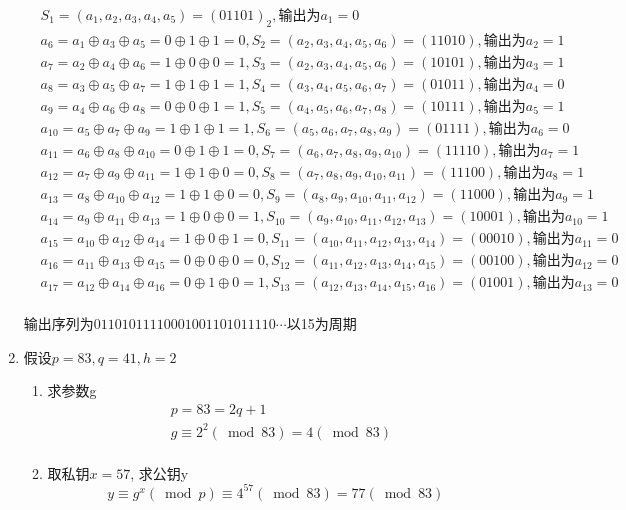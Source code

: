 \documentclass[UTF8]{ctexart}
\begin{document}
\begin{enumerate}
      $$
      \begin{aligned}
        &S_1=(a_1, a_2, a_3, a_4, a_5)=(01101)_2, \mbox{输出为}a_1=0\\
        &a_6=a_1\oplus a_3\oplus a_5=0\oplus 1\oplus 1=0, S_2=(a_2, a_3, a_4, a_5, a_6)=(11010), \mbox{输出为}a_2=1\\
        &a_7=a_2\oplus a_4\oplus a_6=1\oplus 0\oplus 0=1, S_3=(a_2, a_3, a_4, a_5, a_6)=(10101), \mbox{输出为}a_3=1\\
        &a_8=a_3\oplus a_5\oplus a_7=1\oplus 1\oplus 1=1, S_4=(a_3, a_4, a_5, a_6, a_7)=(01011), \mbox{输出为}a_4=0\\
        &a_9=a_4\oplus a_6\oplus a_8=0\oplus 0\oplus 1=1, S_5=(a_4, a_5, a_6, a_7, a_8)=(10111), \mbox{输出为}a_5=1\\
        &a_{10}=a_5\oplus a_7\oplus a_9=1\oplus 1\oplus 1=1, S_6=(a_5, a_6, a_7, a_8, a_9)=(01111), \mbox{输出为}a_6=0\\
        &a_{11}=a_6\oplus a_8\oplus a_{10}=0\oplus 1\oplus 1=0, S_7=(a_6, a_7, a_8, a_9, a_10)=(11110), \mbox{输出为}a_7=1\\
        &a_{12}=a_7\oplus a_9\oplus a_{11}=1\oplus 1\oplus 0=0, S_8=(a_7, a_8, a_9, a_10, a_11)=(11100), \mbox{输出为}a_8=1\\
        &a_{13}=a_8\oplus a_{10}\oplus a_{12}=1\oplus 1\oplus 0=0, S_9=(a_8, a_9, a_10, a_11, a_12)=(11000), \mbox{输出为}a_9=1\\
        &a_{14}=a_9\oplus a_{11}\oplus a_{13}=1\oplus 0\oplus 0=1, S_{10}=(a_9, a_{10}, a_{11}, a_{12}, a_{13})=(10001), \mbox{输出为}a_{10}=1\\
        &a_{15}=a_{10}\oplus a_{12}\oplus a_{14}=1\oplus 0\oplus 1=0, S_{11}=(a_{10}, a_{11}, a_{12}, a_{13}, a_{14})=(00010), \mbox{输出为}a_{11}=0\\
        &a_{16}=a_{11}\oplus a_{13}\oplus a_{15}=0\oplus 0\oplus 0=0, S_{12}=(a_{11}, a_{12}, a_{13}, a_{14}, a_{15})=(00100), \mbox{输出为}a_{12}=0\\
        &a_{17}=a_{12}\oplus a_{14}\oplus a_{16}=0\oplus 1\oplus 0=1, S_{13}=(a_{12}, a_{13}, a_{14}, a_{15}, a_{16})=(01001), \mbox{输出为}a_{13}=0\\
      \end{aligned}
      $$

      输出序列为$01101011110001001101011110\cdots$以15为周期

      \item 假设$p=83, q=41, h=2$
      \begin{enumerate}
        \item 求参数g
        $$
        \begin{aligned}
          &p=83=2q+1\\
          &g\equiv 2^2(\bmod 83)=4(\bmod 83)\\
        \end{aligned}
        $$
        \item 取私钥$x=57$, 求公钥y
        $$
          y\equiv g^x(\bmod p)\equiv 4^{57}(\bmod 83)=77(\bmod 83)
        $$


\end{enumerate}
\end{enumerate}
\end{document}
